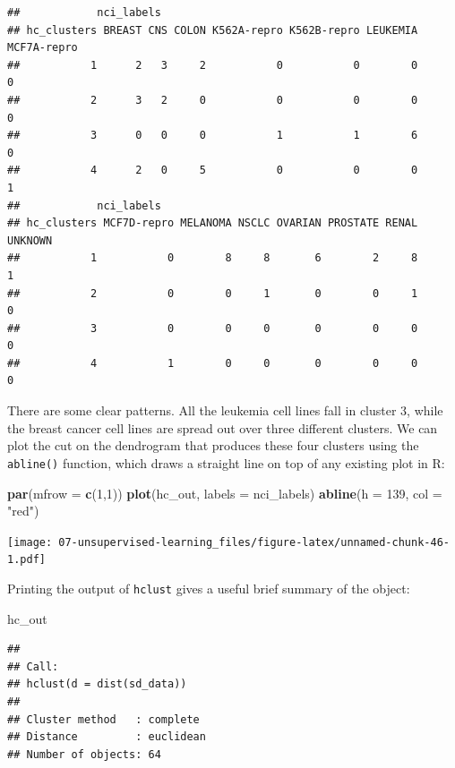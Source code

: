 \documentclass[openany]{book}
\newenvironment{Shaded}{\begin{snugshade}}{\end{snugshade}}
\newcommand{\DataTypeTok}[1]{\textcolor[rgb]{0.13,0.29,0.53}{#1}}
\newcommand{\DecValTok}[1]{\textcolor[rgb]{0.00,0.00,0.81}{#1}}
\newcommand{\KeywordTok}[1]{\textcolor[rgb]{0.13,0.29,0.53}{\textbf{#1}}}
\newcommand{\NormalTok}[1]{#1}
\newcommand{\StringTok}[1]{\textcolor[rgb]{0.31,0.60,0.02}{#1}}
\begin{document}
\begin{verbatim}
##            nci_labels
## hc_clusters BREAST CNS COLON K562A-repro K562B-repro LEUKEMIA MCF7A-repro
##           1      2   3     2           0           0        0           0
##           2      3   2     0           0           0        0           0
##           3      0   0     0           1           1        6           0
##           4      2   0     5           0           0        0           1
##            nci_labels
## hc_clusters MCF7D-repro MELANOMA NSCLC OVARIAN PROSTATE RENAL UNKNOWN
##           1           0        8     8       6        2     8       1
##           2           0        0     1       0        0     1       0
##           3           0        0     0       0        0     0       0
##           4           1        0     0       0        0     0       0
\end{verbatim}

There are some clear patterns. All the leukemia cell lines fall in cluster 3,
while the breast cancer cell lines are spread out over three different clusters.
We can plot the cut on the dendrogram that produces these four clusters using the \texttt{abline()} function, which draws a straight line on top of any existing plot in R:

\begin{Shaded}
\begin{Highlighting}[]
\KeywordTok{par}\NormalTok{(}\DataTypeTok{mfrow =} \KeywordTok{c}\NormalTok{(}\DecValTok{1}\NormalTok{,}\DecValTok{1}\NormalTok{))}
\KeywordTok{plot}\NormalTok{(hc_out, }\DataTypeTok{labels =}\NormalTok{ nci_labels)}
\KeywordTok{abline}\NormalTok{(}\DataTypeTok{h =} \DecValTok{139}\NormalTok{, }\DataTypeTok{col =} \StringTok{"red"}\NormalTok{)}
\end{Highlighting}
\end{Shaded}

\texttt{[image: 07-unsupervised-learning\_files/figure-latex/unnamed-chunk-46-1.pdf]}

Printing the output of \texttt{hclust} gives a useful brief summary of the object:

\begin{Shaded}
\begin{Highlighting}[]
\NormalTok{hc_out}
\end{Highlighting}
\end{Shaded}

\begin{verbatim}
## 
## Call:
## hclust(d = dist(sd_data))
## 
## Cluster method   : complete 
## Distance         : euclidean 
## Number of objects: 64
\end{verbatim}
\end{document}
